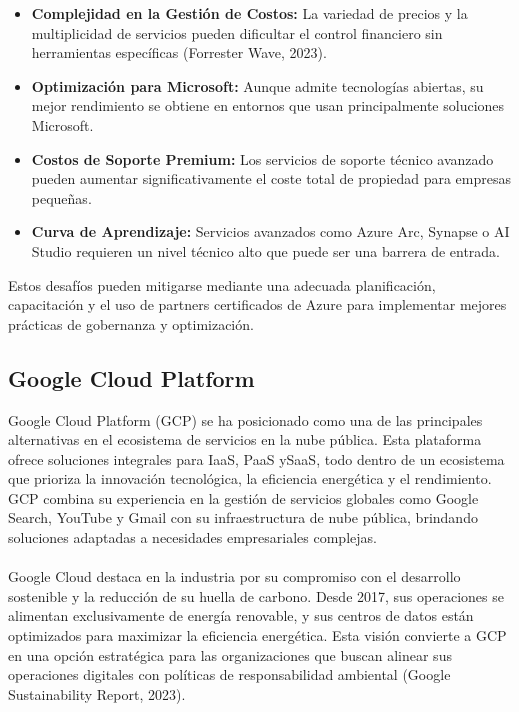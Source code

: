 {                \begin{itemize}
                    \item \textbf{Complejidad en la Gestión de Costos:} La variedad de precios y la multiplicidad de servicios pueden dificultar el control financiero sin herramientas específicas (Forrester Wave, 2023).
                    \item \textbf{Optimización para Microsoft:} Aunque admite tecnologías abiertas, su mejor rendimiento se obtiene en entornos que usan principalmente soluciones Microsoft.
                    \item \textbf{Costos de Soporte Premium:} Los servicios de soporte técnico avanzado pueden aumentar significativamente el coste total de propiedad para empresas pequeñas.
                    \item \textbf{Curva de Aprendizaje:} Servicios avanzados como Azure Arc, Synapse o AI Studio requieren un nivel técnico alto que puede ser una barrera de entrada.
                \end{itemize}
                    
                Estos desafíos pueden mitigarse mediante una adecuada planificación, capacitación y el uso de partners certificados de Azure para implementar mejores prácticas de gobernanza y optimización.

        \subsection{Google Cloud Platform}
            Google Cloud Platform (GCP) se ha posicionado como una de las principales alternativas en el ecosistema de servicios en la nube pública. Esta plataforma ofrece soluciones integrales para IaaS, PaaS ySaaS, todo dentro de un ecosistema que prioriza la innovación tecnológica, la eficiencia energética y el rendimiento. GCP combina su experiencia en la gestión de servicios globales como Google Search, YouTube y Gmail con su infraestructura de nube pública, brindando soluciones adaptadas a necesidades empresariales complejas.
            
            \paragraph{}Google Cloud destaca en la industria por su compromiso con el desarrollo sostenible y la reducción de su huella de carbono. Desde 2017, sus operaciones se alimentan exclusivamente de energía renovable, y sus centros de datos están optimizados para maximizar la eficiencia energética. Esta visión convierte a GCP en una opción estratégica para las organizaciones que buscan alinear sus operaciones digitales con políticas de responsabilidad ambiental (Google Sustainability Report, 2023).
    
}
